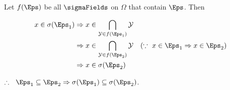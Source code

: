 \def\Y{\mathcal{Y}}

Let $f(\Eps)$ be all $\sigmaFields$ on $\Omega$ that contain $\Eps$. Then

\begin{align*}
  x \in \sigma(\Eps_1) &\Rightarrow x \in \bigcap_{\Y \in f(\Eps_1)} \Y \\
                       &\Rightarrow x \in \bigcap_{\Y \in f(\Eps_2)} \Y
                        ~~~(\because~ x \in \Eps_1 \Rightarrow x \in \Eps_2) \\
                       &\Rightarrow x \in \sigma(\Eps_2)\\
\end{align*}

$\therefore~~ \Eps_1 \subseteq \Eps_2 \Rightarrow \sigma(\Eps_1) \subseteq \sigma(\Eps_2)$.
